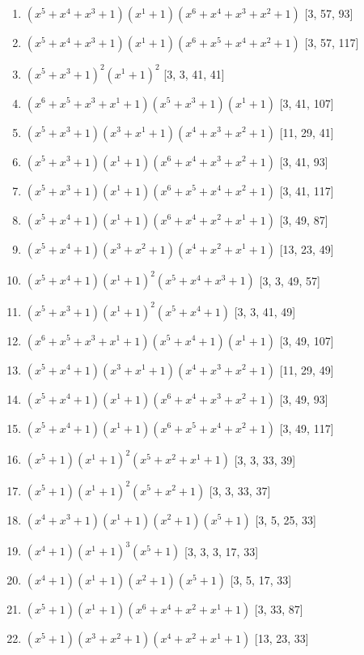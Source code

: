 \documentclass[10pt,twocolumn]{article}
\begin{document}
\begin{enumerate}
\item $(x^{5} + x^{4} + x^{3} + 1)(x^{1} + 1)(x^{6} + x^{4} + x^{3} + x^{2} + 1)$  [3, 57, 93]
\item $(x^{5} + x^{4} + x^{3} + 1)(x^{1} + 1)(x^{6} + x^{5} + x^{4} + x^{2} + 1)$  [3, 57, 117]
\item $(x^{5} + x^{3} + 1)^{2}(x^{1} + 1)^{2}$  [3, 3, 41, 41]
\item $(x^{6} + x^{5} + x^{3} + x^{1} + 1)(x^{5} + x^{3} + 1)(x^{1} + 1)$  [3, 41, 107]
\item $(x^{5} + x^{3} + 1)(x^{3} + x^{1} + 1)(x^{4} + x^{3} + x^{2} + 1)$  [11, 29, 41]
\item $(x^{5} + x^{3} + 1)(x^{1} + 1)(x^{6} + x^{4} + x^{3} + x^{2} + 1)$  [3, 41, 93]
\item $(x^{5} + x^{3} + 1)(x^{1} + 1)(x^{6} + x^{5} + x^{4} + x^{2} + 1)$  [3, 41, 117]
\item $(x^{5} + x^{4} + 1)(x^{1} + 1)(x^{6} + x^{4} + x^{2} + x^{1} + 1)$  [3, 49, 87]
\item $(x^{5} + x^{4} + 1)(x^{3} + x^{2} + 1)(x^{4} + x^{2} + x^{1} + 1)$  [13, 23, 49]
\item $(x^{5} + x^{4} + 1)(x^{1} + 1)^{2}(x^{5} + x^{4} + x^{3} + 1)$  [3, 3, 49, 57]
\item $(x^{5} + x^{3} + 1)(x^{1} + 1)^{2}(x^{5} + x^{4} + 1)$  [3, 3, 41, 49]
\item $(x^{6} + x^{5} + x^{3} + x^{1} + 1)(x^{5} + x^{4} + 1)(x^{1} + 1)$  [3, 49, 107]
\item $(x^{5} + x^{4} + 1)(x^{3} + x^{1} + 1)(x^{4} + x^{3} + x^{2} + 1)$  [11, 29, 49]
\item $(x^{5} + x^{4} + 1)(x^{1} + 1)(x^{6} + x^{4} + x^{3} + x^{2} + 1)$  [3, 49, 93]
\item $(x^{5} + x^{4} + 1)(x^{1} + 1)(x^{6} + x^{5} + x^{4} + x^{2} + 1)$  [3, 49, 117]
\item $(x^{5} + 1)(x^{1} + 1)^{2}(x^{5} + x^{2} + x^{1} + 1)$  [3, 3, 33, 39]
\item $(x^{5} + 1)(x^{1} + 1)^{2}(x^{5} + x^{2} + 1)$  [3, 3, 33, 37]
\item $(x^{4} + x^{3} + 1)(x^{1} + 1)(x^{2} + 1)(x^{5} + 1)$  [3, 5, 25, 33]
\item $(x^{4} + 1)(x^{1} + 1)^{3}(x^{5} + 1)$  [3, 3, 3, 17, 33]
\item $(x^{4} + 1)(x^{1} + 1)(x^{2} + 1)(x^{5} + 1)$  [3, 5, 17, 33]
\item $(x^{5} + 1)(x^{1} + 1)(x^{6} + x^{4} + x^{2} + x^{1} + 1)$  [3, 33, 87]
\item $(x^{5} + 1)(x^{3} + x^{2} + 1)(x^{4} + x^{2} + x^{1} + 1)$  [13, 23, 33]

\end{enumerate}
\end{document}
